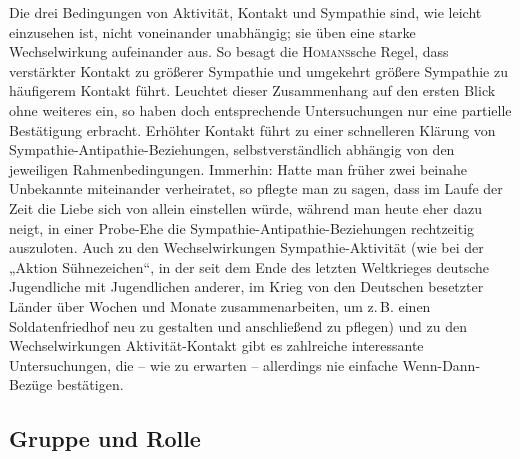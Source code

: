 \documentclass[12pt]{scrartcl}
\DeclareRobustCommand{\zB}{z.\,B.\xspace}
\begin{document}
Die drei Bedingungen von Aktivität, Kontakt und Sympathie sind, wie leicht
einzusehen ist, nicht voneinander unabhängig; sie üben eine starke
Wechselwirkung aufeinander aus. So besagt die \textsc{Homans}sche Regel, dass
verstärkter Kontakt zu größerer Sympathie und umgekehrt größere Sympathie zu
häufigerem Kontakt führt. Leuchtet dieser Zusammenhang auf den ersten Blick
ohne weiteres ein, so haben doch entsprechende Untersuchungen nur eine
partielle Bestätigung erbracht. Erhöhter Kontakt führt zu einer schnelleren
Klärung von Sympathie-Antipathie-Beziehungen, selbstverständlich abhängig von
den jeweiligen Rahmenbedingungen. Immerhin: Hatte man früher zwei beinahe
Unbekannte miteinander verheiratet, so pflegte man zu sagen, dass im Laufe der
Zeit die Liebe sich von allein einstellen würde, während man heute eher dazu
neigt, in einer Probe-Ehe die Sympathie-Antipathie-Beziehungen rechtzeitig
auszuloten. Auch zu den Wechselwirkungen Sympathie-Aktivität (wie bei der
„Aktion Sühnezeichen“, in der seit dem Ende des letzten Weltkrieges deutsche
Jugendliche mit Jugendlichen anderer, im Krieg von den Deutschen besetzter
Länder über Wochen und Monate zusammenarbeiten, um \zB einen
Soldatenfriedhof neu zu gestalten und anschließend zu pflegen) und zu den
Wechselwirkungen Aktivität-Kontakt gibt es zahlreiche interessante
Untersuchungen, die -- wie zu erwarten -- allerdings nie einfache
Wenn-Dann-Bezüge bestätigen.

\subsection{Gruppe und Rolle}
\end{document}
